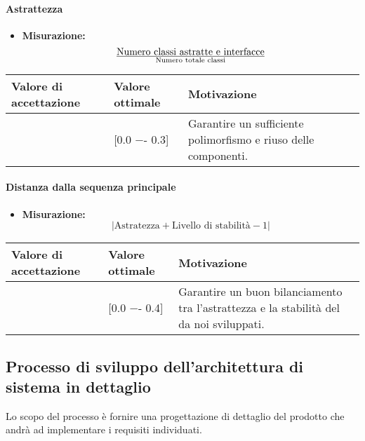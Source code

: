 \paragraph{Astrattezza}

\begin{itemize}
\item \textbf{Misurazione:}
\begin{displaymath}
{\text{Numero classi astratte e interfacce}}\over{\text{Numero totale classi}}
\end{displaymath}
\end{itemize}

\begin{center}
		\begin{tabular}{|P{2.5cm}|P{2.5cm}|P{6cm}|}
		\hline
			\textbf{Valore di accettazione}	& \textbf{Valore ottimale} & \textbf{Motivazione} \\
			\hline
			[0.0 −- 0.8] & [0.0 −- 0.3] &	Garantire un sufficiente polimorfismo e riuso delle componenti. \\
			\hline
			\end{tabular}
\end{center}

\paragraph{Distanza dalla sequenza principale}

\begin{itemize}
\item \textbf{Misurazione:}
\begin{displaymath}
{|\text{Astratezza} + \text{Livello di stabilità} - 1|}
\end{displaymath}
\end{itemize}

\begin{center}
		\begin{tabular}{|P{2.5cm}|P{2.5cm}|P{6cm}|}
		\hline
			\textbf{Valore di accettazione}	& \textbf{Valore ottimale} & \textbf{Motivazione} \\
			\hline
			[0.0 −- 1] & [0.0 −- 0.4] &	Garantire un buon bilanciamento tra l’astrattezza e la stabilità del  da noi sviluppati.\\
			\hline
			\end{tabular}
\end{center}

\subsection{Processo di sviluppo dell'architettura di sistema in dettaglio}
Lo scopo del processo è fornire una progettazione di dettaglio del prodotto che andrà ad implementare i requisiti individuati.
